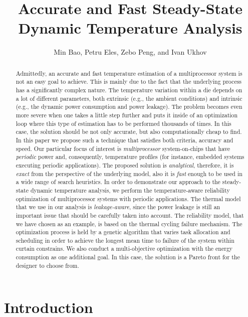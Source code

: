 \documentclass[conference]{IEEEtran}
\title{Accurate and Fast Steady-State\\Dynamic Temperature Analysis}
\author{Min Bao, Petru Eles, Zebo Peng, and Ivan Ukhov}
\begin{document}
  \maketitle

  \begin{abstract}
    Admittedly, an accurate and fast temperature estimation of a multiprocessor system is not an easy goal to achieve. This is mainly due to the fact that the underlying process has a significantly complex nature. The temperature variation within a die depends on a lot of different parameters, both extrinsic (e.g., the ambient conditions) and intrinsic (e.g., the dynamic power consumption and power leakage). The problem becomes even more severe when one takes a little step further and puts it inside of an optimization loop where this type of estimation has to be performed thousands of times. In this case, the solution should be not only accurate, but also computationally cheap to find. In this paper we propose such a technique that satisfies both criteria, accuracy and speed. Our particular focus of interest is \emph{multiprocessor} system-on-chips that have \emph{periodic} power and, consequently, temperature profiles (for instance, embedded systems executing periodic applications). The proposed solution is \emph{analytical}, therefore, it is \emph{exact} from the perspective of the underlying model, also it is \emph{fast} enough to be used in a wide range of search heuristics. In order to demonstrate our approach to the steady-state dynamic temperature analysis, we perform the temperature-aware reliability optimization of multiprocessor systems with periodic applications. The thermal model that we use in our analysis is \emph{leakage-aware}, since the power leakage is still an important issue that should be carefully taken into account. The reliability model, that we have chosen as an example, is based on the thermal cycling failure mechanism. The optimization process is held by a genetic algorithm that varies task allocation and scheduling in order to achieve the longest mean time to failure of the system within curtain constrains. We also conduct a multi-objective optimization with the energy consumption as one additional goal. In this case, the solution is a Pareto front for the designer to choose from.

  \end{abstract}

  \section{Introduction}
  
\end{document}
